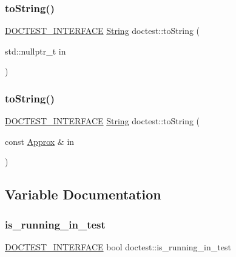 \mbox{\label{namespacedoctest_a88b03675f9b7b8afe5e6d4fa15117181}} 
\subsubsection{\texorpdfstring{to\+String()}{toString()}\hspace{0.1cm}{\footnotesize\ttfamily [17/18]}}
{\footnotesize\ttfamily \mbox{\hyperlink{doctest_8h_a9c16ffc635ec47f07797d21ede26b1a5}{D\+O\+C\+T\+E\+S\+T\+\_\+\+I\+N\+T\+E\+R\+F\+A\+CE}} \mbox{\hyperlink{classdoctest_1_1_string}{String}} doctest\+::to\+String (\begin{DoxyParamCaption}\item[{std\+::nullptr\+\_\+t}]{in }\end{DoxyParamCaption})}

\mbox{\label{namespacedoctest_a63aa06a8555c5aa34a7a6e76e87a3bca}} 
\subsubsection{\texorpdfstring{to\+String()}{toString()}\hspace{0.1cm}{\footnotesize\ttfamily [18/18]}}
{\footnotesize\ttfamily \mbox{\hyperlink{doctest_8h_a9c16ffc635ec47f07797d21ede26b1a5}{D\+O\+C\+T\+E\+S\+T\+\_\+\+I\+N\+T\+E\+R\+F\+A\+CE}} \mbox{\hyperlink{classdoctest_1_1_string}{String}} doctest\+::to\+String (\begin{DoxyParamCaption}\item[{const \mbox{\hyperlink{classdoctest_1_1_approx}{Approx}} \&}]{in }\end{DoxyParamCaption})}



\subsection{Variable Documentation}
\mbox{\label{namespacedoctest_a0b03060093b3894c976b6ae84e55f3f2}} 
\subsubsection{\texorpdfstring{is\+\_\+running\+\_\+in\+\_\+test}{is\_running\_in\_test}}
{\footnotesize\ttfamily \mbox{\hyperlink{doctest_8h_a9c16ffc635ec47f07797d21ede26b1a5}{D\+O\+C\+T\+E\+S\+T\+\_\+\+I\+N\+T\+E\+R\+F\+A\+CE}} bool doctest\+::is\+\_\+running\+\_\+in\+\_\+test}


